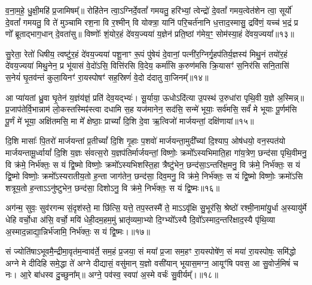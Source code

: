व॒ना॒म॒हे॒ धु॒क्षी॒महि॑ प्र॒जामिषम्᳚॥ रोहि॑तेन त्वा॒\-ऽग्निर्दे॒वतां᳚ गमयतु॒ हरि॑भ्यां॒ त्वेन्द्रो॑ दे॒वतां᳚ गमय॒त्वेत॑शेन त्वा॒ सूर्यो॑ दे॒वतां᳚ गमयतु॒ वि ते॑ मुञ्चामि रश॒ना वि र॒श्मीन् वि योक्त्रा॒ यानि॑ परि॒चर्त॑नानि ध॒त्ताद॒स्मासु॒ द्रवि॑णं॒ यच्च॑ भ॒द्रं प्र णो᳚ ब्रूताद्भाग॒धान् दे॒वता॑सु॥ विष्णोः᳚ शं॒योर॒हं दे॑वय॒ज्यया॑ य॒ज्ञेन॑ प्रति॒ष्ठां ग॑मेय॒ꣳ॒ सोम॑स्या॒हं दे॑वय॒ज्यया᳚॥१३॥

सु॒रेता॒ रेतो॑ धिषीय॒ त्वष्टु॑र॒हं दे॑वय॒ज्यया॑ पशू॒नाꣳ रू॒पं पु॑षेयं दे॒वानां॒ पत्नी॑र॒ग्निर्गृ॒हप॑तिर्य॒ज्ञस्य॑ मिथु॒नं तयो॑र॒हं दे॑वय॒ज्यया॑ मिथु॒नेन॒ प्र भू॑यासं वे॒दो॑\-ऽसि॒ वित्ति॑रसि वि॒देय॒ कर्मा॑सि क॒रुण॑मसि क्रि॒यासꣳ॑ स॒निर॑सि सनि॒तासि॑ स॒नेयं॑ घृ॒तव॑न्तं कुला॒यिनꣳ॑ रा॒यस्पोषꣳ॑ सह॒स्रिणं॑ वे॒दो द॑दातु वा॒जिनम्᳚॥१४॥

{\anuvakamend[{इन्द्र॑स्या॒हमिन्द्र॑वन्तः॒ सोम॑स्या॒हं दे॑वय॒ज्यया॒ चतु॑श्चत्वारिꣳशच्च॥४॥}]}

आ प्या॑यतां ध्रु॒वा घृ॒तेन॑ य॒ज्ञंय॑ज्ञं॒ प्रति॑ देव॒यद्भ्यः॑। सू॒र्याया॒ ऊधो\-ऽदि॑त्या उ॒पस्थ॑ उ॒रुधा॑रा पृथि॒वी य॒ज्ञे अ॒स्मिन्न्॥ प्र॒जाप॑तेर्वि॒भान्नाम॑ लो॒कस्तस्मिꣴ॑स्त्वा दधामि स॒ह यज॑मानेन॒ सद॑सि॒ सन्मे॑ भूयाः॒ सर्व॑मसि॒ सर्वं॑ मे भूयाः पू॒र्णम॑सि पू॒र्णं मे॑ भूया॒ अक्षि॑तमसि॒ मा मे᳚ क्षेष्ठाः॒ प्राच्यां᳚ दि॒शि दे॒वा ऋ॒त्विजो॑ मार्जयन्तां॒ दक्षि॑णायां॥१५॥

दि॒शि मासाः᳚ पि॒तरो॑ मार्जयन्तां प्र॒तीच्यां᳚ दि॒शि गृ॒हाः प॒शवो॑ मार्जयन्ता॒मुदी᳚च्यां दि॒श्याप॒ ओष॑धयो॒ वन॒स्पत॑यो मार्जयन्तामू॒र्ध्वायां᳚ दि॒शि य॒ज्ञः सं॑वत्स॒रो य॒ज्ञप॑तिर्मार्जयन्तां॒ विष्णोः॒ क्रमो᳚\-ऽस्यभिमाति॒हा गा॑य॒त्रेण॒ छन्द॑सा पृथि॒वीमनु॒ वि क्र॑मे॒ निर्भ॑क्तः॒ स यं द्वि॒ष्मो विष्णोः॒ क्रमो᳚\-ऽस्यभिशस्ति॒हा त्रैष्टु॑भेन॒ छन्द॑सा॒\-ऽन्तरि॑क्ष॒मनु॒ वि क्र॑मे॒ निर्भ॑क्तः॒ स यं द्वि॒ष्मो विष्णोः॒ क्रमो᳚\-ऽस्यरातीय॒तो ह॒न्ता जाग॑तेन॒ छन्द॑सा॒ दिव॒मनु॒ वि क्र॑मे॒ निर्भ॑क्तः॒ स यं द्वि॒ष्मो विष्णोः॒ क्रमो॑\-ऽसि शत्रूय॒तो ह॒न्ता\-ऽ\-ऽनु॑ष्टुभेन॒ छन्द॑सा॒ दिशो\-ऽनु॒ वि क्र॑मे॒ निर्भ॑क्तः॒ स यं द्वि॒ष्मः॥१६॥

{\anuvakamend[{दक्षि॑णायां द्वि॒ष्मो विष्णो॒रेका॒न्नत्रि॒ꣳ॒शच्च॑॥५॥}]}

अग॑न्म॒ सुवः॒ सुव॑रगन्म सं॒दृश॑स्ते॒ मा छि॑त्सि॒ यत्ते॒ तप॒स्तस्मै॑ ते॒ मा\-ऽ\-ऽवृ॑क्षि सु॒भूर॑सि॒ श्रेष्ठो॑ रश्मी॒नामा॑यु॒र्धा अ॒स्यायु॑र्मे धेहि वर्चो॒धा अ॑सि॒ वर्चो॒ मयि॑ धेही॒दम॒हम॒मुं भ्रातृ॑व्यमा॒भ्यो दि॒ग्भ्यो᳚\-ऽस्यै दि॒वो᳚\-ऽस्माद॒न्तरि॑क्षाद॒स्यै पृ॑थि॒व्या अ॒स्माद॒न्नाद्या॒न्निर्भ॑जामि॒ निर्भ॑क्तः॒ स यं द्वि॒ष्मः।॥१७॥

सं ज्योति॑षा\-ऽभूवमै॒न्द्रीमा॒वृत॑म॒न्वाव॑र्ते॒ सम॒हं प्र॒जया॒ सं मया᳚ प्र॒जा सम॒हꣳ रा॒यस्पोषे॑ण॒ सं मया॑ रा॒यस्पोषः॒ समि॑द्धो अग्ने मे दीदिहि समे॒द्धा ते॑ अग्ने दीद्यासं॒ वसु॑मान् य॒ज्ञो वसी॑यान् भूयास॒मग्न॒ आयूꣳ॑षि पवस॒ आ सु॒वोर्ज॒मिषं॑ च नः। आ॒रे बा॑धस्व दु॒च्छुना᳚म्॥ अग्ने॒ पव॑स्व॒ स्वपा॑ अ॒स्मे वर्चः॑ सु॒वीर्यम्᳚।॥१८॥

